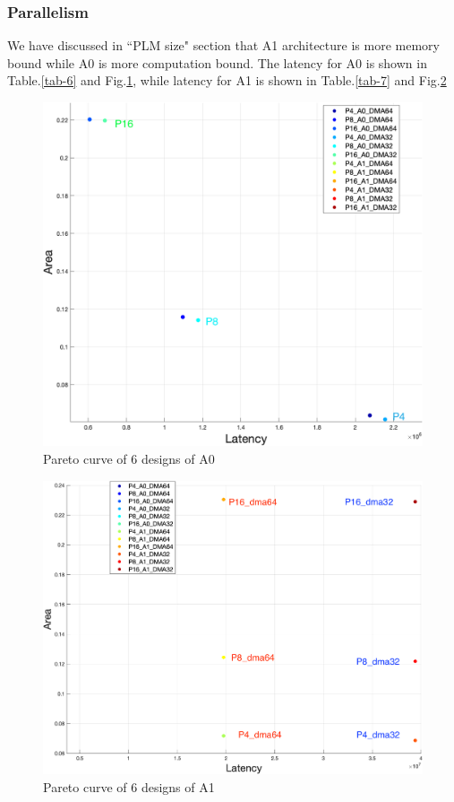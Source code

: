 \documentclass{sig-alternate}
\begin{document}
\subsubsection{Parallelism}

We have discussed in ``PLM size" section that A1 architecture is more memory bound while A0 is more computation bound. The latency for A0 is shown in Table.\ref{tab-6} and Fig.\ref{fig-2}, while latency for A1 is shown in Table.\ref{tab-7} and Fig.\ref{fig-3}


\begin{figure}[h!]
    \centering
    \includegraphics[width=0.85\columnwidth]{figure/result_A0.png}
    \caption{Pareto curve of 6 designs of A0}
    \label{fig-2}
\end{figure}

\begin{figure}[h!]
    \centering
    \includegraphics[width=0.85\columnwidth]{figure/result_A1.png}
    \caption{Pareto curve of 6 designs of A1}
    \label{fig-3}
\end{figure}
\end{document}
